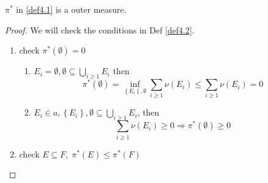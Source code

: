 \begin{theorem}
	$ \pi^{*} $ in \ref{def4.1} is a outer measure.
	\label{thm4.1}
\end{theorem}

\begin{proof}
	We will check the conditions in  Def \ref{def4.2}. 
	\begin{enumerate}
		\item check ${\pi ^*}\left( \emptyset  \right) = 0$
		\begin{enumerate}
			\item ${E_i} = \emptyset ,\emptyset  \subseteq \bigcup\limits_{i \geqslant 1} {{E_i}} $ then
			\begin{equation}
			{\pi ^*}\left( \emptyset  \right) = \mathop {\inf }\limits_{\left\{ {{E_i}} \right\},\emptyset } \sum\limits_{i \geqslant 1} {\nu \left( {{E_i}} \right)}  \leqslant \sum\limits_{i \geqslant 1} {\nu \left( {{E_i}} \right)}  = 0
			\end{equation}
			\item ${E_i} \in a,\left\{ {{E_i}} \right\},\emptyset  \subseteq \bigcup\limits_{i \geqslant 1} {{E_i}} $, then
			\begin{equation}
			\sum\limits_{i \geqslant 1} {\nu \left( {{E_i}} \right)}  \geqslant 0 \Rightarrow {\pi ^*}\left( \emptyset  \right) \geqslant 0
			\end{equation}
		\end{enumerate}
		\item check $E \subseteq F,\;{\pi ^*}\left( E \right) \leqslant {\pi ^*}\left( F \right)$
		

\end{enumerate}
\end{proof}
